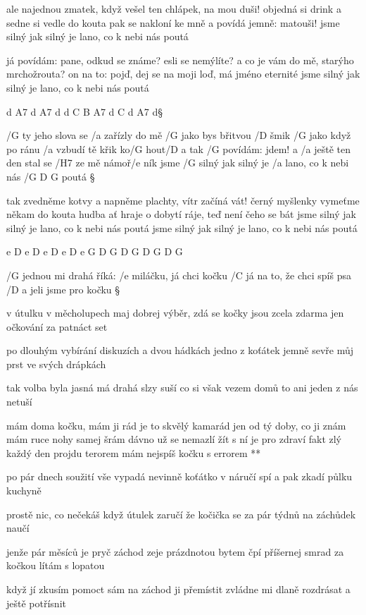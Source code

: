 ale najednou zmatek, když vešel ten chlápek, na mou duši!
objedná si drink a sedne si vedle do kouta
pak se nakloní ke mně a povídá jemně: matouši!
jsme silný jak silný je lano, co k nebi nás poutá \s

já povídám: pane, odkud se známe? esli se nemýlíte?
a co je vám do mě, starýho mrchožrouta?
on na to: pojď, dej se na moji loď, má jméno eternité
jsme silný jak silný je lano, co k nebi nás poutá \s

d A7 d A7 d
d C B A7 d C d A7 d\S

/G ty jeho slova se /a zařízly do mě /G jako bys břitvou /D šmik
/G jako když po ránu /a vzbudí tě křik ko/G hout/D a
tak /G povídám: jdem! a /a ještě ten den stal se /H7 ze mě námoř/e ník
jsme /G silný jak silný je /a lano, co k nebi nás /{G D G} poutá \S

tak zvedněme kotvy a napněme plachty, vítr začíná vát!
černý myšlenky vymeťme někam do kouta
hudba ať hraje o dobytí ráje, teď není čeho se bát
jsme silný jak silný je lano, co k nebi nás poutá
jsme silný jak silný je lano, co k nebi nás poutá \s

e D e D e D e D e
G D G D G D G D G



/G jednou mi drahá říká: /e miláčku, já chci kočku
/C já na to, že chci spíš psa /D a jeli jsme pro kočku \S

v útulku v měcholupech maj dobrej výběr, zdá se
kočky jsou zcela zdarma jen očkování za patnáct set \s

po dlouhým vybírání diskuzích a dvou hádkách
jedno z koťátek jemně sevře můj prst ve svých drápkách \s

tak volba byla jasná má drahá slzy suší
co si však vezem domů to ani jeden z nás netuší

\R mám doma kočku, mám ji rád je to skvělý kamarád
   jen od tý doby, co ji znám mám ruce nohy samej šrám
   dávno už se nemazlí žít s ní je pro zdraví fakt zlý
   každý den projdu terorem mám nejspíš kočku s errorem **

po pár dnech soužití vše vypadá nevinně
koťátko v náručí spí a pak zkadí půlku kuchyně \s

prostě nic, co nečekáš když útulek zaručí
že kočička se za pár týdnů na záchůdek naučí \s

jenže pár měsíců je pryč záchod zeje prázdnotou
bytem čpí příšernej smrad za kočkou lítám s lopatou \s

když jí zkusím pomoct sám na záchod ji přemístit
zvládne mi dlaně rozdrásat a ještě potřísnit

